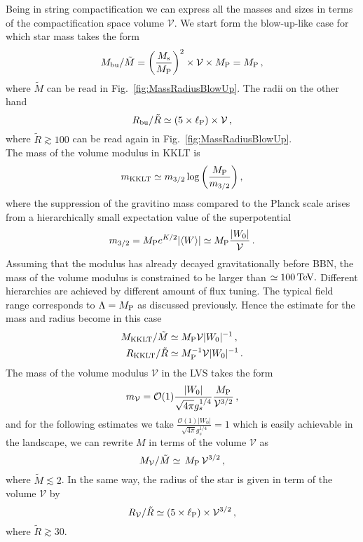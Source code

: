 \documentclass[11pt,a4paper]{article}
\newcommand{\V}{\mathcal{V}}
\begin{document}
Being in string compactification we can express all the masses and sizes in terms of the compactification space volume $\V$. We start form the blow-up-like case for which star mass takes the form
\begin{equation}
M_{\rm bu}/\tilde{M} = \left(\frac{M_{\rm s}}{M_{\rm P}}\right)^2 \times \V \times M_{\rm P} = M_{\rm P} \,,
\end{equation}
where $\tilde{M}$ can be read in Fig.~\ref{fig:MassRadiusBlowUp}. The radii on the other hand
\begin{equation}
R_{\rm bu}/\tilde{R} \simeq \left(5 \times \ell_{\rm P}\right) \times \V \,,
\end{equation}
where $\tilde{R} \gtrsim 100$ can be read again in Fig.~\ref{fig:MassRadiusBlowUp}.\\

The mass of the volume modulus in KKLT is
\begin{equation}
 m_{\rm KKLT}\simeq m_{3/2}\log{\left(\frac{M_{\rm P}}{m_{3/2}}\right)} \,,
\end{equation}
where the suppression of the gravitino mass compared to the Planck scale arises from a hierarchically small expectation value of the superpotential
\begin{equation}
 m_{3/2}=M_{\rm P} e^{K/2} |\langle W\rangle| \simeq M_{\rm P} \frac{|W_0|}{\V}\,.
\end{equation}
Assuming that the modulus has already decayed gravitationally before BBN, the mass of the volume modulus is constrained to be larger than $\simeq 100 \,{\rm TeV}.$ Different hierarchies are achieved by different amount of flux tuning. The typical field range corresponds to $\Lambda=M_{\rm P}$ as discussed previously. Hence the estimate for the mass and radius become in this case
\begin{align}
 M_{\rm KKLT}/\tilde{M} & \simeq M_{\rm P} \V |W_0|^{-1}\,,\\
 R_{\rm KKLT}/\tilde{R} & \simeq M_{\rm P}^{-1} \V |W_0|^{-1}\,.
\end{align}
The mass of the volume modulus $\V$ in the LVS takes the form~\cite{Balasubramanian:2005zx, Conlon:2005ki}
\begin{equation}
m_{\V} = \mathcal{O}(1) \frac{|W_0|}{\sqrt{4 \pi} g_s^{1/4}} \frac{M_{\rm P}}{\V^{3/2}} \,,
\end{equation}
and for the following estimates we take $\frac{\mathcal{O}(1)|W_0|}{\sqrt{4 \pi} g_s^{1/4}} = 1$ which is easily achievable in the landscape, we can rewrite $M$ in terms of the volume $\V$ as
\begin{equation}
M_{\V}/\tilde{M} \simeq \, M_{\rm P} \, \V^{3/2}  \,,
\end{equation}
where $\tilde{M} \lesssim 2$. In the same way, the radius of the star is given in term of the volume $\V$ by
\begin{equation}
R_{\V}/\tilde{R} \simeq \left(5 \times \ell_{\rm P}\right) \times \V^{3/2} \,,
\end{equation}
where $\tilde{R} \gtrsim 30$.\\
\end{document}
